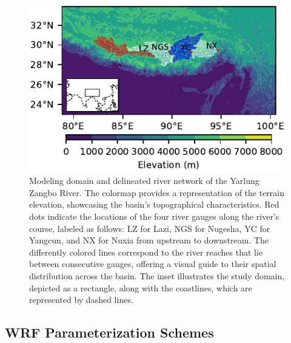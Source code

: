 \documentclass[draft]{agujournal2019}
\begin{document}
\begin{figure}[h!]
  \centering
  \noindent\includegraphics[width=140mm]{domain.pdf}
  \caption{Modeling domain and delineated river network of the Yarlung Zangbo River. The colormap provides a representation of the terrain elevation, showcasing the basin's topographical characteristics. Red dots indicate the locations of the four river gauges along the river's course, labeled as follows: LZ for Lazi, NGS for Nugesha, YC for Yangcun, and NX for Nuxia from upstream to downstream. The differently colored lines correspond to the river reaches that lie between consecutive gauges, offering a visual guide to their spatial distribution across the basin. The inset illustrates the study domain, depicted as a rectangle, along with the coastlines, which are represented by dashed lines.}\label{fig:domain}
\end{figure}

\subsection{WRF Parameterization Schemes}
\end{document}

